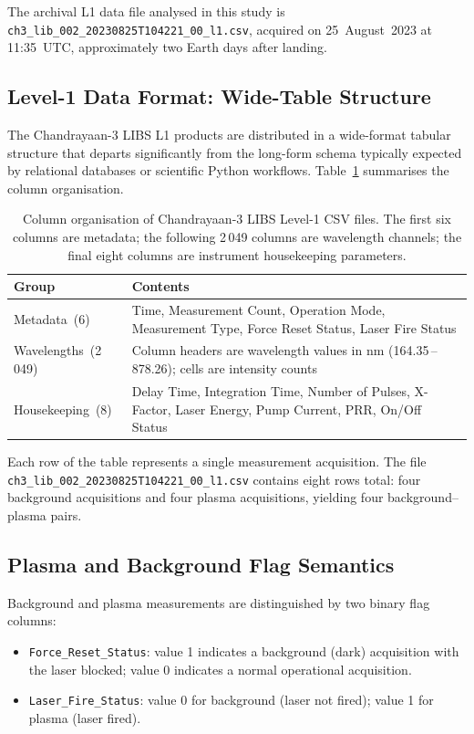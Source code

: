 \documentclass[a4paper,twocolumn,10pt]{article}
\begin{document}
The archival L1 data file analysed in this study is
\texttt{ch3\_lib\_002\_20230825T104221\_00\_l1.csv}, acquired on
25~August~2023 at 11:35~UTC, approximately two Earth days after
landing.

\subsection{Level-1 Data Format: Wide-Table Structure}

The Chandrayaan-3 LIBS L1 products are distributed in a wide-format
tabular structure that departs significantly from the long-form schema
typically expected by relational databases or scientific Python
workflows.  Table~\ref{tab:l1_schema} summarises the column
organisation.

\begin{table}[htbp]
\centering
\caption{Column organisation of Chandrayaan-3 LIBS Level-1 CSV files.
  The first six columns are metadata; the following 2\,049 columns are
  wavelength channels; the final eight columns are instrument
  housekeeping parameters.}
\label{tab:l1_schema}
{\small
\begin{tabularx}{\columnwidth}{@{}lX@{}}
\toprule
\textbf{Group} & \textbf{Contents} \\
\midrule
Metadata~(6) & Time, Measurement Count, Operation Mode,
  Measurement Type, Force Reset Status, Laser Fire Status \\
\addlinespace
Wavelengths~(2\,049) & Column headers are wavelength values
  in nm (164.35\,--\,878.26); cells are intensity counts \\
\addlinespace
Housekeeping~(8) & Delay Time, Integration Time,
  Number of Pulses, X-Factor, Laser Energy,
  Pump Current, PRR, On/Off Status \\
\bottomrule
\end{tabularx}
}
\end{table}

Each row of the table represents a single measurement acquisition.
The file \texttt{ch3\_lib\_002\_20230825T104221\_00\_l1.csv} contains
eight rows total: four background acquisitions and four plasma
acquisitions, yielding four background--plasma pairs.

\subsection{Plasma and Background Flag Semantics}

Background and plasma measurements are distinguished by two binary
flag columns:
\begin{itemize}[nosep,leftmargin=*]
  \item \texttt{Force\_Reset\_Status}: value 1 indicates a background
    (dark) acquisition with the laser blocked; value 0 indicates a
    normal operational acquisition.
  \item \texttt{Laser\_Fire\_Status}: value 0 for background (laser not
    fired); value 1 for plasma (laser fired).
\end{itemize}
\end{document}

